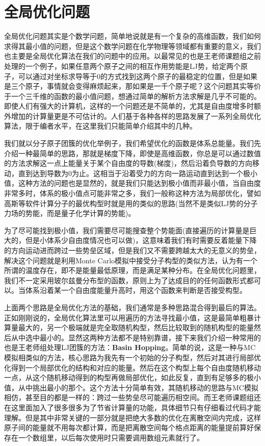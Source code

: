 \documentclass[12pt,a4paper,openany,twoside]{book}
\numberwithin{equation}{section}
\begin{document}
    \chapter{全局优化问题}
      全局优化问题其实是个数学问题，简单地说就是有一个复杂的高维函数，我们如何求得其最小值的问题，但是这个数学问题在化学物理等领域都有重要的意义，我们也主要是全局优化算法在我们的问题中的应用。以最常见的也是王老师课题组之前处理的一个例子，如果任意两个原子之间的相互作用势能是LJ势，给定两个原子，可以通过对坐标求导等于0的方式找到这两个原子的最稳定的位置，但是如果是三个原子，事情就会变得麻烦起来，那如果是一千个原子呢？这个问题其实等价于一个三千维的函数的最小值问题，想通过简单的解析方法求解是几乎不可能的。即使人们有强大的计算机，这样的一个问题还是不简单的，尤其是自由度增多时额外增加的计算量更是不可估计的。人们基于各种各样的思路发展了一系列全局优化算法，限于编者水平，在这里我们只能简单介绍其中的几种。

      我们就以分子原子团簇的优化举例子，我们希望优化的函数是体系总能量。我们先介绍一种最简单的思路，那就是梯度下降，即使是高维函数，你总是可以通过数值的方法求解这一点上能量关于某个自由度的导数(梯度)，然后沿着负导数的方向移动，直到达到导数为0为止。这相当于沿着受力的方向一路运动直到达到一个极小值，这种方法的问题也是显然的，就是我们只能达到极小值而非最小值，当自由度非常多时，体系的极小值点可能非常之多，我们一般称这种方法为局部优化，譬如高斯等软件计算分子的最优构型时就是用的类似的思路(当然不是类似LJ势的分子力场的势能，而是量子化学计算的势能)。

      为了尽可能找到极小值，我们需要尽可能搜查整个势能面(直接遍历的计算量是巨大的，但是小体系少自由度情况也可以做)，这意味着我们有时需要反着能量下降的方向运动进而跨过一些势垒区域，但是我们又不需要跨越太大的无意义的势垒，解决这个问题就是利用Monte Carlo模拟中接受分子构型的类似方法，认为有一个所谓的温度存在，即不是能量最低原理，而是满足某种分布。在全局优化问题里，我们不一定采用玻尔兹曼分布型的函数，原则上为了达成目的的任何函数形式都可以。当体系沿着某一个自由度能量升高时，用这个函数来判断是否接受构型。

      上面两个思路是全局优化方法的基础，我们通常是多种思路混合得到最后的算法。正如刚刚说的，全局优化算法里可以用遍历的方法寻找最小值，这是最简单粗暴计算量最大的，另一个极端就是完全取随机构型，然后比较取到的随机构型的能量然后从中选中最小的。显然这两种方法都不是特别靠谱，接下来我们介绍一种常用的也是王老师组处理LJ团簇的方法：\textbf{Basin Hopping}。简单的说，这是一种与MC模拟相类似的方法，核心思路为我先有一个初始的分子构型，然后对其进行局部优化得到一个局部优化的结构和对应的能量。然后在这个构型上每个自由度随机移动一点，从这个随机移动得到的构型再做局部优化，如此反复，直到有足够多的极小值，从中挑出最小的那个。这个方法十分简单有效，其随机移动的思路与MC模拟相仿，甚至目的都是一样的：跨过一些势垒尽可能遍历相空间。而王老师课题组还在这里面加入了很多很多为了节省计算量的功能，具体细节只有仔细看过代码才能理解。但是其中非常关键的一部分就是把绝大多数的优化在离散空间内完成，这样原子间的能量就不用每次都计算，而是把离散空间每个格点距离的能量提前算好保存在一个数组里，以后每次使用时只需要调用数组元素就行了。
\end{document}
